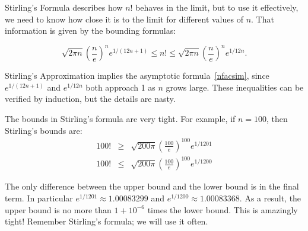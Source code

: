 Stirling's Formula describes how $n!$ behaves in the limit, but to use it
effectively, we need to know how close it is to the limit for different
values of $n$.  That information is given by the bounding formulas:
\begin{fact*}
\[
\sqrt{2 \pi n} \left(\frac{n}{e}\right)^n e^{1/(12n+1)} \leq n! \leq
\sqrt{2 \pi n} \left(\frac{n}{e}\right)^n e^{1/12n}.
\]
\end{fact*}
Stirling's Approximation implies the asymptotic formula~\eqref{nfacsim},
since $e^{1/(12n+1)}$ and $e^{1/12n}$ both approach 1 as $n$ grows large.
These inequalities can be verified by induction, but the details are
nasty.

The bounds in Stirling's formula are very tight.  For example, if $n =
100$, then Stirling's bounds are:
\begin{eqnarray*}
100! & \geq & \sqrt{200 \pi} \left(\frac{100}{e}\right)^{100} e^{1/1201} \\
100! & \leq & \sqrt{200 \pi} \left(\frac{100}{e}\right)^{100} e^{1/1200}
\end{eqnarray*}

The only difference between the upper bound and the lower bound is in
the final term.  In particular $e^{1/1201} \approx 1.00083299$ and
$e^{1/1200} \approx 1.00083368$.  As a result, the upper bound is no
more than $1 + 10^{-6}$ times the lower bound.  This is amazingly
tight!  Remember Stirling's formula; we will use it often.

